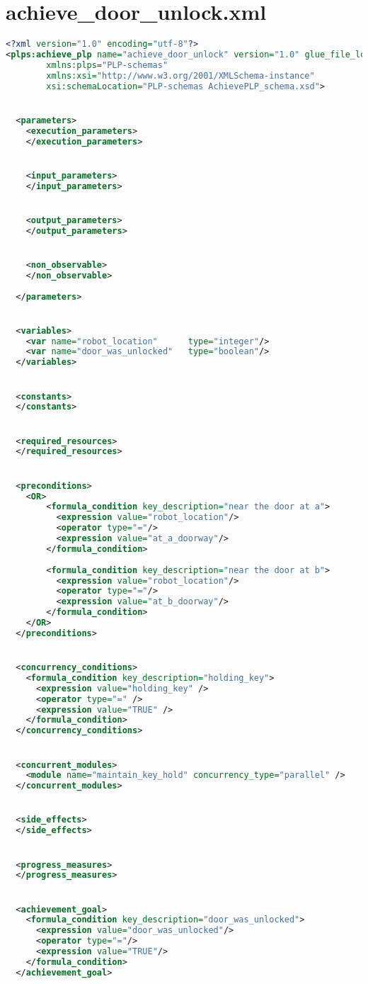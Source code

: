 \section{  achieve_door_unlock.xml}\label{Appendix_3_4} 
\begin{lstlisting}[style=stylexml,language=XML]
<?xml version="1.0" encoding="utf-8"?>
<plps:achieve_plp name="achieve_door_unlock" version="1.0" glue_file_location=""
        xmlns:plps="PLP-schemas"
        xmlns:xsi="http://www.w3.org/2001/XMLSchema-instance"
        xsi:schemaLocation="PLP-schemas AchievePLP_schema.xsd">


  <parameters>
    <execution_parameters>
    </execution_parameters>


    <input_parameters>
    </input_parameters>


    <output_parameters>
    </output_parameters>


    <non_observable>
    </non_observable>
    
  </parameters>


  <variables>
    <var name="robot_location"      type="integer"/>
    <var name="door_was_unlocked"   type="boolean"/>
  </variables>


  <constants>
  </constants>


  <required_resources>
  </required_resources>


  <preconditions>
    <OR>
        <formula_condition key_description="near the door at a">
          <expression value="robot_location"/>
          <operator type="="/>
          <expression value="at_a_doorway"/>
        </formula_condition>
        
        <formula_condition key_description="near the door at b">
          <expression value="robot_location"/>
          <operator type="="/>
          <expression value="at_b_doorway"/>
        </formula_condition>
    </OR>
  </preconditions>


  <concurrency_conditions>
    <formula_condition key_description="holding_key">
      <expression value="holding_key" />
      <operator type="=" />
      <expression value="TRUE" />
    </formula_condition>
  </concurrency_conditions>


  <concurrent_modules>
    <module name="maintain_key_hold" concurrency_type="parallel" />
  </concurrent_modules>


  <side_effects>
  </side_effects>


  <progress_measures>
  </progress_measures>


  <achievement_goal>
    <formula_condition key_description="door_was_unlocked">
      <expression value="door_was_unlocked"/>
      <operator type="="/>
      <expression value="TRUE"/>
    </formula_condition>
  </achievement_goal>



\end{lstlisting}
